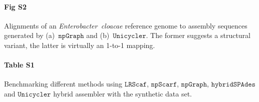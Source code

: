 \documentclass[10pt,letterpaper]{article}
\newcommand{\npscarf}{$\mathtt{npScarf}$}
\newcommand{\npgraph}{$\mathtt{npGraph}$}
\newcommand{\unicycler}{$\mathtt{Unicycler}$}
\newcommand{\lrscaf}{$\mathtt{LRScaf}$}
\begin{document}
\paragraph*{Fig S2}
Alignments of an \emph{Enterobacter~cloacae} reference genome to assembly sequences generated by  (a)~\npgraph{} and (b)~\unicycler{}. The former suggests a structural variant, the latter is virtually an 1-to-1 mapping.


\paragraph*{Table S1}
Benchmarking different methods using \lrscaf{}, \npscarf{}, \npgraph{}, $\mathtt{hybridSPAdes}$ and \unicycler{} hybrid assembler with the synthetic data set.


\clearpage
\end{document}
